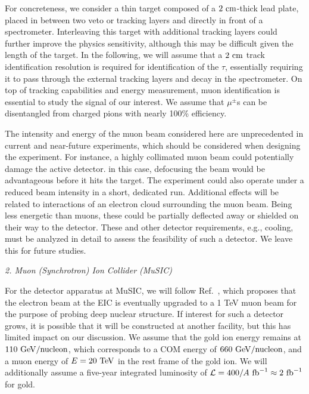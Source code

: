 For concreteness, we consider a thin target composed of a $2~{\rm cm}$-thick lead plate, placed in between two veto or tracking layers and directly in front of a spectrometer. Interleaving this target with additional tracking layers could further improve the physics sensitivity, although this may be difficult given the length of the target. In the following, we will assume that a $2~{\rm cm}$ track identification resolution is required for identification of the $\tau$, essentially requiring it to pass through the external tracking layers and decay in the spectrometer. On top of tracking capabilities and energy measurement, muon identification is essential to study the signal of our interest. We assume that $\mu^\pm$s can be disentangled from charged pions with nearly 100\% efficiency.

The intensity and energy of the muon beam considered here are unprecedented in current and near-future experiments, which should be considered when designing the experiment. For instance, a highly collimated muon beam could potentially damage the active detector. in this case, defocusing the beam would be advantageous before it hits the target. The experiment could also operate under a reduced beam intensity in a short, dedicated run. Additional effects will be related to interactions of an electron cloud surrounding the muon beam. Being less energetic than muons, these could be partially deflected away or shielded on their way to the detector. These and other detector requirements, e.g., cooling, must be analyzed in detail to assess the feasibility of such a detector. We leave this for future studies. 

\begin{center}
    {\it 2. Muon (Synchrotron) Ion Collider (MuSIC)}
\end{center}

For the detector apparatus at MuSIC, we will follow Ref.~\cite{Acosta:2021qpx}, which proposes that the electron beam at the EIC is eventually upgraded to a 1 TeV muon beam for the purpose of probing deep nuclear structure. If interest for such a detector grows, it is possible that it will be constructed at another facility, but this has limited impact on our discussion. We assume that the gold ion energy remains at $110~{\rm GeV}/{\rm nucleon}$, which corresponds to a COM energy of $660~{\rm GeV}/{\rm nucleon}$, and a muon energy of $E = 20~{\rm TeV}$ in the rest frame of the gold ion. We will additionally assume a five-year integrated luminosity of ${\cal L} = 400/A~{\rm fb}^{-1} \approx 2~{\rm fb}^{-1}$ for gold. 


